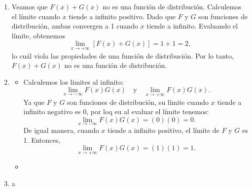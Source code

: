 \documentclass{article}
\begin{document}
\begin{enumerate}
\begin{enumerate}[label={(\roman*)}]
        Consideremos \(a \in (0, 1)\) y verifiquemos las propiedades de la función.
        \begin{itemize}
            \item Calculemos los límites al infinito: 
            \[
            \lim_{x \to -\infty} aF(x) + (1 - a)G(x) \quad \text{y} \lim_{x \to +\infty} aF(x) + (1 - a)G(x).
            \]
            Ya que \(F\) y \(G\) son funciones de distribución, su límite cuando \(x\) tiende a infinito negativo es 0, por lo que al evaluar el límite tenemos:
            \[
            \lim_{x \to -\infty} aF(x) + (1 - a)G(x) = a(0) + (1 - a)(0) = 0.
            \]
            Análogamente, cuando \(x\) tiende a infinito positivo, el límite de \(F\) y \(G\) es 1. Por lo tanto,
            \[
            \lim_{x \to +\infty} aF(x) + (1 - a)G(x) = a(1) + (1 - a)(1) = a + 1 - a = 1.
            \]
            \item Dado que \(a \geq 0\), entonces la monotonicidad del primer término \(aF(x)\) es igual a la de \(F(x)\), que es creciente por hipótesis. De forma similar, como \(a \leq 1\), entonces \((1 - a) \geq 0\) y el término \((1 - a)G(x)\) es creciente también. Dado que la suma de funciones crecientes es creciente, se sigue que la función \(aF(x) + (1 - a)G(x)\) es creciente.
            \item Ya que hemos probado que la función es creciente y su valor en sus límites es 0 y 1, se sigue que 
            \[
            0 \leq aF(x) + (1 - a)G(x) \leq 1.
            \]
        \end{itemize}
        Como hemos verificado las propiedades, entonces la función \(aF(x) + (1 - a)G(x)\) es una función de distribución.
        \item Veamos que \(F(x) + G(x)\) no es una función de distribución. Calculemos el límite cuando \(x\) tiende a infinito positivo. Dado que \(F\) y \(G\) son funciones de distribución, ambas convergen a 1 cuando \(x\) tiende a infinito. Evaluando el límite, obtenemos 
    \[
    \lim_{x \to +\infty} [F(x) + G(x)] = 1 + 1 = 2,
    \]
    lo cuál viola las propiedades de una función de distribución. Por lo tanto, \(F(x) + G(x)\) no es una función de distribución.
    \item \begin{itemize}
        \item Calculemos los límites al infinito:
        \[
        \lim_{x \to -\infty}F(x)G(x) \quad \text{y} \quad \lim_{x \to +\infty} F(x)G(x).
        \]
        Ya que \(F\) y \(G\) son funciones de distribución, su límite cuando \(x\) tiende a infinito negativo es 0, por loq eu al evaluar el límite tenemos:
        \[
        \lim_{x \to -\infty}F(x)G(x) = (0)(0) = 0.
        \]
        De igual manera, cuando \(x\) tiende a infinito positivo, el límite de \(F\) y \(G\) es 1. Entonces,
        \[
        \lim_{x \to +\infty}F(x)G(x) = (1)(1) = 1.
        \]
        \item 
    \end{itemize}
    \item a
\end{enumerate}
\end{enumerate}
\end{document}
